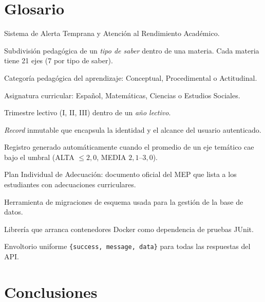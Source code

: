 \documentclass[11pt,a4paper,oneside]{article}
\newcommand{\code}[1]{\texttt{\small #1}}
\begin{document}
\section{Glosario}

\begin{description}[leftmargin=2.0cm,style=nextline,labelwidth=*,font=\bfseries\color{ataraAzul}]
  \item[ATARA] Sistema de Alerta Temprana y Atención al Rendimiento Académico.
  \item[Eje temático] Subdivisión pedagógica de un \emph{tipo de saber} dentro de una materia.
                      Cada materia tiene 21 ejes (7 por tipo de saber).
  \item[Tipo de saber] Categoría pedagógica del aprendizaje: Conceptual, Procedimental o
                       Actitudinal.
  \item[Materia] Asignatura curricular: Español, Matemáticas, Ciencias o Estudios Sociales.
  \item[Periodo] Trimestre lectivo (I, II, III) dentro de un \emph{año lectivo}.
  \item[ContextoUsuario] \emph{Record} inmutable que encapsula la identidad y el alcance
                         del usuario autenticado.
  \item[Alerta temática] Registro generado automáticamente cuando el promedio de un eje
                         temático cae bajo el umbral (ALTA $\leq 2{,}0$, MEDIA $2{,}1$--$3{,}0$).
  \item[PIAD] Plan Individual de Adecuación: documento oficial del MEP que lista a los
              estudiantes con adecuaciones curriculares.
  \item[Flyway] Herramienta de migraciones de esquema usada para la gestión de la base de
                datos.
  \item[Testcontainers] Librería que arranca contenedores Docker como dependencia de pruebas
                        JUnit.
  \item[ApiResponse] Envoltorio uniforme \code{\{success, message, data\}} para todas las
                     respuestas del API.
\end{description}

\section{Conclusiones}
\end{document}
